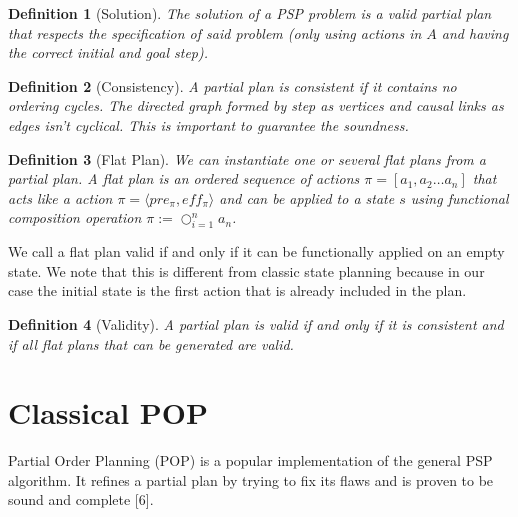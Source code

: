 \documentclass[]{article}
\newtheorem{definition}{Definition}
\begin{document}
\begin{definition}[Solution]

The solution of a PSP problem is a valid partial plan that respects the
specification of said problem (only using actions in \(A\) and having
the correct initial and goal step).

\end{definition}

\begin{definition}[Consistency]

A partial plan is consistent if it contains no ordering cycles. The
directed graph formed by step as vertices and causal links as edges
isn't cyclical. This is important to guarantee the soundness.

\end{definition}

\begin{definition}[Flat Plan]

We can instantiate one or several flat plans from a partial plan. A flat
plan is an ordered sequence of actions \(\pi = [ a_1, a_2 \ldots a_n]\)
that acts like a action \(\pi = \langle pre_\pi, eff_\pi \rangle\) and
can be applied to a state \(s\) using functional composition operation
\(\pi := \bigcirc_{i=1}^n a_n\).

\end{definition}

We call a flat plan valid if and only if it can be functionally applied
on an empty state. We note that this is different from classic state
planning because in our case the initial state is the first action that
is already included in the plan.

\begin{definition}[Validity]

A partial plan is valid if and only if it is consistent and if all flat
plans that can be generated are valid.

\end{definition}

\section{Classical POP}\label{classical-pop}

Partial Order Planning (POP) is a popular implementation of the general
PSP algorithm. It refines a partial plan by trying to fix its flaws and
is proven to be sound and complete {[}6{]}.
\end{document}
